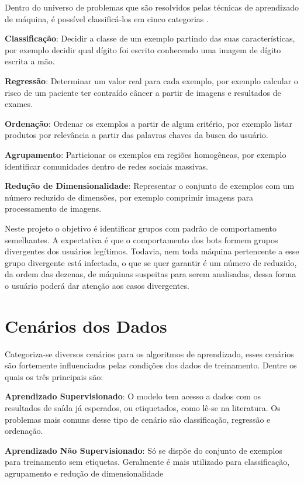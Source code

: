 Dentro do universo de problemas que são resolvidos pelas técnicas de aprendizado de máquina, é possível classificá-los em cinco categorias \citep{mohri2012foundations}.

\begin{description}
\item \textbf{Classificação}: Decidir a classe de um exemplo partindo das suas características, por exemplo decidir qual dígito foi escrito conhecendo uma imagem de dígito escrita a mão.
\item \textbf{Regressão}: Determinar um valor real para cada exemplo, por exemplo calcular o risco de um paciente ter contraído câncer a partir de imagens e resultados de exames.
\item \textbf{Ordenação}: Ordenar os exemplos a partir de algum critério, por exemplo listar produtos por relevância a partir das palavras chaves da busca do usuário.
\item \textbf{Agrupamento}: Particionar os exemplos em regiões homogêneas, por exemplo identificar comunidades dentro de redes sociais massivas.
\item \textbf{Redução de Dimensionalidade}: Representar o conjunto de exemplos com um número reduzido de dimensões, por exemplo comprimir imagens para processamento de imagens.
\end{description}

Neste projeto o objetivo é identificar grupos com padrão de comportamento semelhantes. A expectativa é que o comportamento dos bots formem grupos divergentes dos usuários legítimos. Todavia, nem toda máquina pertencente a esse grupo divergente está infectada, o que se quer garantir é um número de reduzido, da ordem das dezenas, de máquinas suspeitas para serem analisadas, dessa forma o usuário poderá dar atenção aos casos divergentes.

\section{Cenários dos Dados}

Categoriza-se \citep{mohri2012foundations} diversos cenários para os algoritmos de aprendizado, esses cenários são fortemente influenciados pelas condições dos dados de treinamento. Dentre os quais os três principais são:

\begin{description}
\item \textbf{Aprendizado Supervisionado}: O modelo tem acesso a dados com os resultados de saída já esperados, ou etiquetados, como lê-se na literatura. Os problemas mais comuns desse tipo de cenário são classificação, regressão e ordenação.

\item \textbf{Aprendizado Não Supervisionado}: Só se dispõe do conjunto de exemplos para treinamento sem etiquetas. Geralmente é mais utilizado para classificação, agrupamento e redução de dimensionalidade

\end{description}

